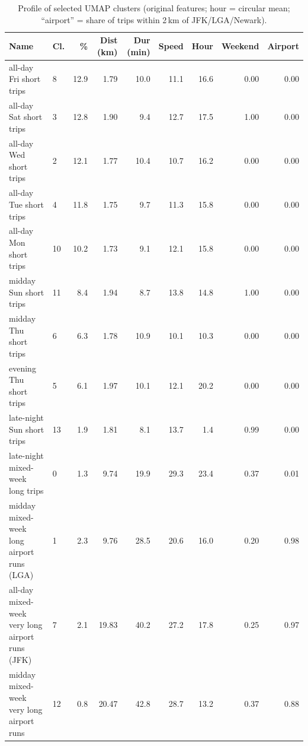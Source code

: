\documentclass{article}
\begin{document}
\begin{table}[!htbp]\centering\scriptsize
\caption{Profile of selected UMAP clusters (original features; hour = circular mean; ``airport'' = share of trips within 2\,km of JFK/LGA/Newark).}\label{tab:prof}
\begin{tabular}{llrrrrrrr}\toprule Name & Cl. & \% & Dist (km) & Dur (min) & Speed & Hour & Weekend & Airport\\\midrule
all-day Fri short trips & 8 & 12.9 & 1.79 & 10.0 & 11.1 & 16.6 & 0.00 & 0.00\\
all-day Sat short trips & 3 & 12.8 & 1.90 & 9.4 & 12.7 & 17.5 & 1.00 & 0.00\\
all-day Wed short trips & 2 & 12.1 & 1.77 & 10.4 & 10.7 & 16.2 & 0.00 & 0.00\\
all-day Tue short trips & 4 & 11.8 & 1.75 & 9.7 & 11.3 & 15.8 & 0.00 & 0.00\\
all-day Mon short trips & 10 & 10.2 & 1.73 & 9.1 & 12.1 & 15.8 & 0.00 & 0.00\\
midday Sun short trips & 11 & 8.4 & 1.94 & 8.7 & 13.8 & 14.8 & 1.00 & 0.00\\
midday Thu short trips & 6 & 6.3 & 1.78 & 10.9 & 10.1 & 10.3 & 0.00 & 0.00\\
evening Thu short trips & 5 & 6.1 & 1.97 & 10.1 & 12.1 & 20.2 & 0.00 & 0.00\\
late-night Sun short trips & 13 & 1.9 & 1.81 & 8.1 & 13.7 & 1.4 & 0.99 & 0.00\\
late-night mixed-week long trips & 0 & 1.3 & 9.74 & 19.9 & 29.3 & 23.4 & 0.37 & 0.01\\
midday mixed-week long airport runs (LGA) & 1 & 2.3 & 9.76 & 28.5 & 20.6 & 16.0 & 0.20 & 0.98\\
all-day mixed-week very long airport runs (JFK) & 7 & 2.1 & 19.83 & 40.2 & 27.2 & 17.8 & 0.25 & 0.97\\
midday mixed-week very long airport runs & 12 & 0.8 & 20.47 & 42.8 & 28.7 & 13.2 & 0.37 & 0.88\\\bottomrule\end{tabular}
\end{table}
\end{document}
